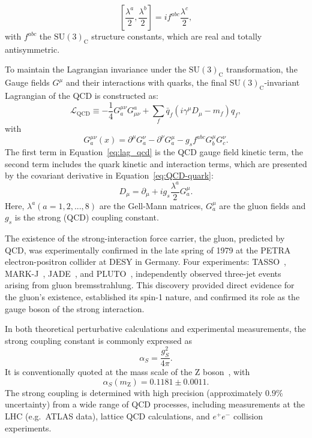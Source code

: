 \begin{equation}
    \left[\frac{\lambda^{a}}{2}, \frac{\lambda^{b}}{2}\right]=i f^{a b c} \frac{\lambda^{c}}{2},
\end{equation}
with $f^{a b c}$ the $\text{SU}(3)_{\text{C}}$ structure constants, which are real and totally antisymmetric.

To maintain the Lagrangian invariance under the $\text{SU}(3)_{\text{C}}$ transformation, the Gauge fields $G^{\mu}$ and their interactions with quarks, the final $\text{SU}(3)_{\text{C}}$-invariant Lagrangian of the QCD is constructed as:
\begin{equation}\label{eq:lag_qcd}
    \mathcal{L}_{\text{QCD}} \equiv-\frac{1}{4} G_{a}^{\mu \nu} G_{\mu \nu}^{a}+\sum_{f} \bar{q}_{f}\left(i \gamma^{\mu} D_{\mu}-m_{f}\right) q_{f},
\end{equation}
with
\begin{equation}
    G_{a}^{\mu \nu}(x)=\partial^{\mu} G_{a}^{\nu}-\partial^{\nu} G_{a}^{\mu}-g_{s} f^{a b c} G_{b}^{\mu} G_{c}^{\nu}.
\end{equation}
The first term in Equation~\eqref{eq:lag_qcd} is the QCD gauge field kinetic term, the second term includes the quark kinetic and interaction terms, which are presented by the covariant derivative in Equation~\eqref{eq:QCD-quark}:
\begin{equation}\label{eq:QCD-quark}
    D_{\mu}=\partial_{\mu}+i g_s \frac{\lambda^{a}}{2} G_{a}^{\mu}.
\end{equation}
Here, $\lambda^{a} (a = 1,2,...,8)$ are the Gell-Mann matrices, $G_{a}^{\mu}$ are the gluon fields and $g_s$ is the strong (QCD) coupling constant.

The existence of the strong-interaction force carrier, the gluon, predicted by QCD, was experimentally confirmed in the late spring of 1979 at the PETRA electron-positron collider at DESY in Germany. Four experiments: TASSO~\cite{Tasso1979_PlanarEvents}, MARK-J~\cite{MarkJ1979_ThreeJet}, JADE~\cite{JADE1980_PlanarThreeJets}, and PLUTO~\cite{Pluto1979_GluonBremsstrahlung}, independently observed three-jet events arising from gluon bremsstrahlung. This discovery provided direct evidence for the gluon's existence, established its spin-1 nature, and confirmed its role as the gauge boson of the strong interaction.

In both theoretical perturbative calculations and experimental measurements, the strong coupling constant is commonly expressed as
\begin{equation}
\alpha_S = \frac{g_S^2}{4\pi}.
\end{equation}
It is conventionally quoted at the mass scale of the $\text{Z}$ boson~\cite{PDG2016}, with
\begin{equation}
\alpha_S(m_{\text{Z}}) = 0.1181 \pm 0.0011.
\end{equation}
The strong coupling is determined with high precision (approximately $0.9\%$ uncertainty) from a wide range of QCD processes, including measurements at the LHC (e.g.\ ATLAS data), lattice QCD calculations, and $e^+e^-$ collision experiments.
